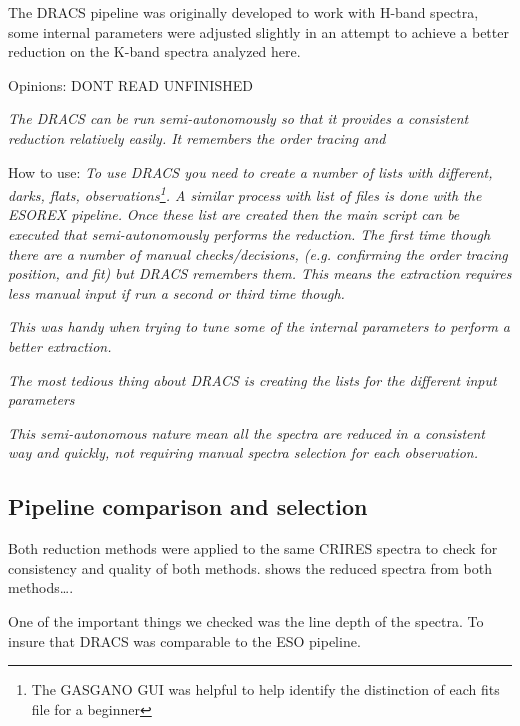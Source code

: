The DRACS pipeline was originally developed to work with H-band spectra, some internal parameters were adjusted slightly in an attempt to achieve a better reduction on the K-band spectra analyzed here.


Opinions:
DONT READ UNFINISHED 

\textit{The DRACS can be run semi-autonomously so that it provides a consistent reduction relatively easily. It remembers the order tracing and}

How to use:
\textit{To use DRACS you need to create a number of lists with different, darks, flats, observations\footnote{The GASGANO GUI was helpful to help identify the distinction of each fits file for a beginner}. A similar process with list of files is done with the ESOREX pipeline.}
\textit{Once these list are created then the main script can be executed that semi-autonomously performs the reduction. The first time though there are a number of manual checks/decisions, (e.g. confirming the order tracing position, and fit) but DRACS remembers them. This means the extraction requires less manual input if run a second or third time though.}

\textit{This was handy when trying to tune some of the internal parameters to perform a better extraction.}


\textit{The most tedious thing about DRACS is creating the lists for the different input parameters}

\textit{This semi-autonomous nature mean all the spectra are reduced in a consistent way and quickly, not requiring manual spectra selection for each observation.}


\subsection{Pipeline comparison and selection}

Both reduction methods were applied to the same CRIRES spectra to check for consistency and quality of both methods.  shows the reduced spectra from both methods\ldots.

One of the important things we checked was the line depth of the spectra. To insure that DRACS was comparable to the ESO pipeline.
\begin{figure}
   \label{fig:reductioncomparsion}
\end{figure}

